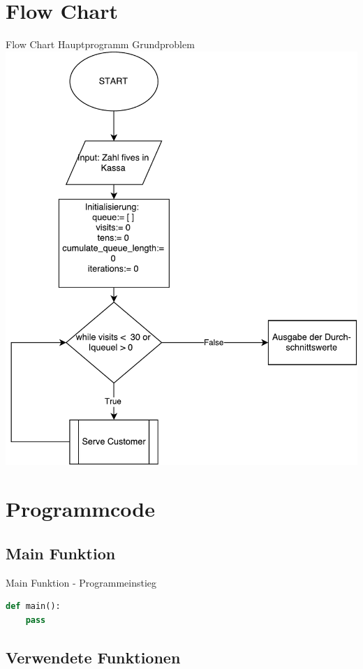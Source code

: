 \section{Flow Chart}
\begin{frame}{Flow Chart Hauptprogramm Grundproblem}
	\centering
  	\includegraphics[scale=0.4]{BSP18_Flow_Chart_1.pdf}
\end{frame}

\section{Programmcode}
\subsection{Main Funktion}
\begin{frame}[fragile]{Main Funktion - Programmeinstieg}
  \begin{lstlisting}[language=python]
def main():
	pass
\end{lstlisting}
\logopythonbottom
\end{frame}

\subsection{Verwendete Funktionen}
%
%


